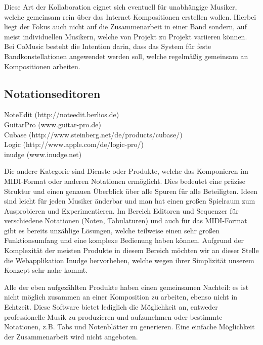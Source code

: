\documentclass[12pt]{scrartcl}
\begin{document}
Diese Art der Kollaboration eignet sich eventuell für unabhängige Musiker, welche gemeinsam rein über das Internet Kompositionen erstellen wollen. Hierbei liegt der Fokus auch nicht auf die Zusammenarbeit in einer Band sondern, auf meist individuellen Musikern, welche von Projekt zu Projekt variieren können. Bei CoMusic besteht die Intention darin, dass das System für feste Bandkonstellationen angewendet werden soll, welche regelmäßig gemeinsam an Kompositionen arbeiten.






\subsection{Notationseditoren}

\begin{description}
\item[NoteEdit (http://noteedit.berlios.de)]
\item[GuitarPro (www.guitar-pro.de)]
\item[Cubase (http://www.steinberg.net/de/products/cubase/)]
\item[Logic (http://www.apple.com/de/logic-pro/)]
\item[inudge (www.inudge.net)]
\end{description}



Die andere Kategorie sind Dienste oder Produkte, welche das Komponieren im MIDI-Format oder anderen Notationen ermöglicht. Dies bedeutet eine präzise Struktur und einen genauen Überblick über alle Spuren für alle Beteiligten. Ideen sind leicht für jeden Musiker änderbar und man hat einen großen Spielraum zum Ausprobieren und Experimentieren.
Im Bereich Editoren und Sequenzer für verschiedene Notationen (Noten, Tabulaturen) und auch für das MIDI-Format gibt es bereits unzählige Lösungen, welche teilweise einen sehr großen Funktionsumfang und eine komplexe Bedienung haben können.  Aufgrund der Komplexität der meisten Produkte in diesem Bereich möchten wir an dieser Stelle die Webapplikation Inudge  hervorheben, welche wegen ihrer Simplizität unserem Konzept sehr nahe kommt.

Alle der eben aufgezählten Produkte haben einen gemeinsamen Nachteil: es ist nicht möglich zusammen an einer Komposition zu arbeiten, ebenso nicht in Echtzeit. Diese Software bietet lediglich die Möglichkeit an, entweder professionelle Musik zu produzieren und aufzunehmen oder bestimmte Notationen, z.B. Tabs und Notenblätter zu generieren. Eine einfache Möglichkeit der Zusammenarbeit wird nicht angeboten.
\end{document}
